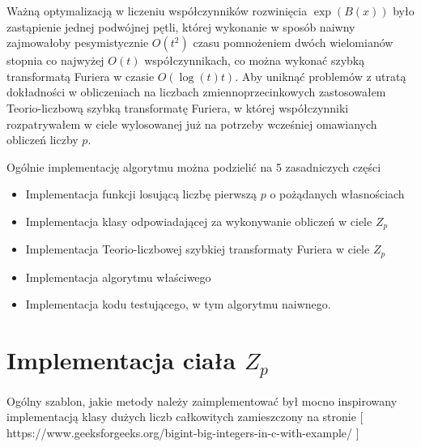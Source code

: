\documentclass{article}
\begin{document}

Ważną optymalizacją w liczeniu współczynników rozwinięcia $\exp(B(x))$ było zastąpienie jednej podwójnej pętli, 
której wykonanie w sposób naiwny zajmowałoby pesymistycznie $O(t^2)$ czasu pomnożeniem dwóch wielomianów stopnia co 
najwyżej $O(t)$ współczynnikach, co można wykonać szybką 
transformatą Furiera w czasie $O(\log(t)t)$. Aby uniknąć problemów z utratą dokładności w obliczeniach na liczbach 
zmiennoprzecinkowych zastosowałem Teorio-liczbową szybką transformatę Furiera, w której współczynniki rozpatrywałem w ciele 
wylosowanej już na potrzeby wcześniej omawianych obliczeń 
liczby $p$.

Ogólnie implementację algorytmu można podzielić na 5 zasadniczych części
\begin{itemize}
  \item Implementacja funkcji losującą liczbę pierwszą $p$ o pożądanych własnościach
  \item Implementacja klasy odpowiadającej za wykonywanie obliczeń w ciele $Z_p$
  \item Implementacja Teorio-liczbowej szybkiej transformaty Furiera w ciele $Z_p$
  \item Implementacja algorytmu właściwego
  \item Implementacja kodu testującego, w tym algorytmu naiwnego.
\end{itemize}




\section{Implementacja ciała $Z_p$}

Ogólny szablon, jakie metody należy zaimplementować był 
mocno inspirowany implementacją klasy dużych liczb całkowitych
zamieszczony na stronie [ https://www.geeksforgeeks.org/bigint-big-integers-in-c-with-example/ ]
\end{document}
